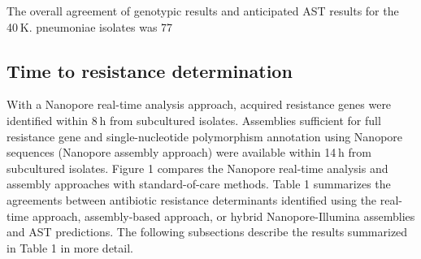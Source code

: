 The overall agreement of genotypic results and anticipated AST results for the 40 K. pneumoniae isolates was 77%


\subsection{Time to resistance determination}
\label{sec:time}

With a Nanopore real-time analysis approach, acquired resistance genes were identified within 8 h from subcultured isolates. Assemblies sufficient for full resistance gene and single-nucleotide polymorphism annotation using Nanopore sequences (Nanopore assembly approach) were available within 14 h from subcultured isolates. Figure 1 compares the Nanopore real-time analysis and assembly approaches with standard-of-care methods. Table 1 summarizes the agreements between antibiotic resistance determinants identified using the real-time approach, assembly-based approach, or hybrid Nanopore-Illumina assemblies and AST predictions. The following subsections describe the results summarized in Table 1 in more detail.

